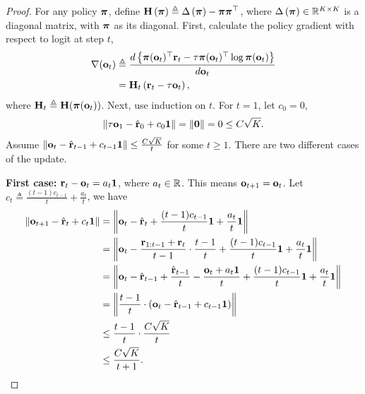 \begin{proof}
For any policy ${\boldsymbol{\pi}}$, define ${\mathbf{H}}\left( {\boldsymbol{\pi}} \right) \triangleq \Delta \left( {\boldsymbol{\pi}} \right) - {\boldsymbol{\pi}} {\boldsymbol{\pi}}^\top$, where $\Delta \left( {\boldsymbol{\pi}} \right) \in {\mathbb{R}}^{K \times K}$ is a diagonal matrix, with ${\boldsymbol{\pi}}$ as its diagonal. First, calculate the policy gradient with respect to logit at step $t$,
\begin{equation*}
\begin{split}
    \nabla({\mathbf{o}}_t) &\triangleq \frac{d \left\{ {\boldsymbol{\pi}}({\mathbf{o}}_t)^\top {\mathbf{r}}_t - \tau {\boldsymbol{\pi}}({\mathbf{o}}_t)^\top \log{{\boldsymbol{\pi}}({\mathbf{o}}_t)} \right\} }{d {\mathbf{o}}_t} \\
    &= {\mathbf{H}}_t \left( {\mathbf{r}}_t - \tau {\mathbf{o}}_t \right),
\end{split}
\end{equation*}
where ${\mathbf{H}}_t \triangleq {\mathbf{H}}({\boldsymbol{\pi}}({\mathbf{o}}_t))$. Next, use induction on $t$. For $t=1$, let $c_0 = 0$,
\begin{equation*}
\begin{split}
    \left\| \tau {\mathbf{o}}_{1} - \hat{{\mathbf{r}}}_0 + c_0 {\mathbf{1}} \right\| = \left\| {\mathbf{0}} \right\| = 0 \le C \sqrt{K}.
\end{split}
\end{equation*}
Assume $\left\| {\mathbf{o}}_{t} - \hat{{\mathbf{r}}}_{t-1} + c_{t-1} {\mathbf{1}} \right\| \le \frac{C \sqrt{K}}{t}$ for some $t \ge 1$. There  are two different cases of the update.

\textbf{First case:} ${\mathbf{r}}_t - {\mathbf{o}}_t = a_t {\mathbf{1}}$, where $a_t \in {\mathbb{R}}$. This means ${\mathbf{o}}_{t+1} = {\mathbf{o}}_{t}$. Let $c_t \triangleq \frac{(t-1)c_{t-1}}{t} +  \frac{a_t}{t}$, we have
\begin{equation*}
\begin{split}
    \left\| {\mathbf{o}}_{t+1} - \hat{{\mathbf{r}}}_t + c_t {\mathbf{1}} \right\| &= \left\| {\mathbf{o}}_{t} - \hat{{\mathbf{r}}}_t + \frac{(t-1)c_{t-1}}{t} {\mathbf{1}} + \frac{a_t}{t} {\mathbf{1}} \right\| \\
    &= \left\| {\mathbf{o}}_{t} - \frac{{\mathbf{r}}_{1:t-1} + {\mathbf{r}}_t}{t-1} \cdot \frac{t-1}{t} + \frac{(t-1)c_{t-1}}{t} {\mathbf{1}} + \frac{a_t}{t} {\mathbf{1}} \right\| \\
    &= \left\| {\mathbf{o}}_{t} - \hat{{\mathbf{r}}}_{t-1} + \frac{\hat{{\mathbf{r}}}_{t-1}}{t} - \frac{{\mathbf{o}}_t + a_t {\mathbf{1}}}{t} + \frac{(t-1)c_{t-1}}{t} {\mathbf{1}} + \frac{a_t}{t} {\mathbf{1}} \right\| \\
    &= \left\| \frac{t-1}{t} \cdot \left( {\mathbf{o}}_{t} - \hat{{\mathbf{r}}}_{t-1} + c_{t-1} {\mathbf{1}} \right) \right\| \\
    &\le \frac{t-1}{t} \cdot \frac{C \sqrt{K}}{t} \\
    &\le \frac{C \sqrt{K}}{t+1}.
\end{split}
\end{equation*}


\end{proof}
